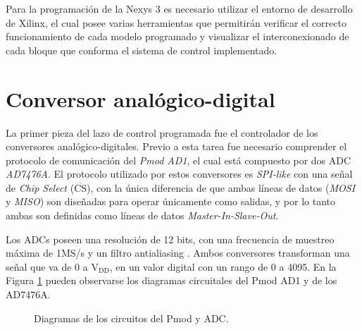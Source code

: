Para la programación de la Nexys 3 es necesario utilizar el entorno de desarrollo de Xilinx, el cual posee varias herramientas que permitirán verificar el correcto funcionamiento de cada modelo programado y visualizar el interconexionado de cada bloque que conforma el sistema de control implementado. 

\section{Conversor analógico-digital}

La primer pieza del lazo de control programada fue el controlador de los conversores analógico-digitales. Previo a esta tarea fue necesario comprender el protocolo de comunicación del \emph{Pmod AD1}, el cual está compuesto por dos ADC \emph{AD7476A}. El protocolo utilizado por estos conversores es \emph{SPI-like} con una señal de \emph{Chip Select} ($\overline{\mbox{CS}}$), con la única diferencia de que ambas líneas de datos (\emph{MOSI} y \emph{MISO}) son diseñadas para operar únicamente como salidas, y por lo tanto ambas son definidas como líneas de datos \emph{Master-In-Slave-Out}.

Los ADCs poseen una resolución de 12 bits, con una frecuencia de muestreo máxima de 1MS/s y un filtro antialiasing \cite{ad7476a}. Ambos conversores transforman una señal que va de 0 a $\mathrm{V_{DD}}$, en un valor digital con un rango de 0 a 4095. En la Figura \ref{diagramas-adc} pueden observarse los diagramas circuitales del Pmod AD1 y de los AD7476A.

\begin{figure}[hbt!]
    \centering
    \hspace{10mm}
    \caption{Diagramas de los circuitos del Pmod y ADC.}
    \label{diagramas-adc}
\end{figure}

